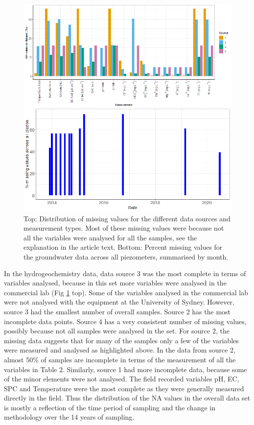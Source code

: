 \documentclass[, manuscript]{copernicus}
\begin{document}
\begin{figure}
\includegraphics[width=0.9\linewidth]{Figures/na_count} \caption{Top: Distribution of missing values for the different data sources and measurement types. Most of these missing values were because not all the variables were analysed for all the samples, see the explanation in the article text. Bottom: Percent missing values for the groundwater data across all piezometers, summarised by month.}\label{fig:na-plot}
\end{figure}

In the hydrogeochemistry data, data source 3 was the most complete in
terms of variables analysed, because in this set more variables were
analysed in the commercial lab (Fig \ref{fig:na-plot} top). Some of the
variables analysed in the commercial lab were not analysed with the
equipment at the University of Sydney. However, source 3 had the
smallest number of overall samples. Source 2 has the most incomplete
data points. Source 4 has a very consistent number of missing values,
possibly because not all samples were analysed in the set. For source 2,
the missing data suggests that for many of the samples only a few of the
variables were measured and analysed as highlighted above. In the data
from source 2, almost 50\% of samples are incomplete in terms of the
measurement of all the variables in Table 2. Similarly, source 1 had
more incomplete data, because some of the minor elements were not
analysed. The field recorded variables pH, EC, SPC and Temperature were
the most complete as they were generally measured directly in the field.
Thus the distribution of the NA values in the overall data set is mostly
a reflection of the time period of sampling and the change in
methodology over the 14 years of sampling.
\end{document}
